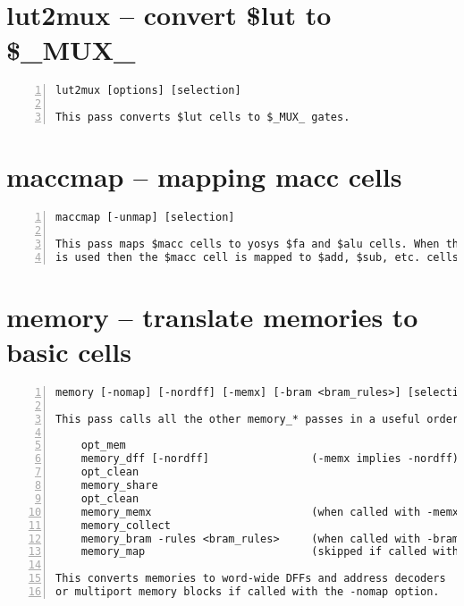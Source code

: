 \section{lut2mux -- convert \$lut to \$\_MUX\_}
\label{cmd:lut2mux}
\begin{lstlisting}[numbers=left,frame=single]
    lut2mux [options] [selection]

This pass converts $lut cells to $_MUX_ gates.
\end{lstlisting}

\section{maccmap -- mapping macc cells}
\label{cmd:maccmap}
\begin{lstlisting}[numbers=left,frame=single]
    maccmap [-unmap] [selection]

This pass maps $macc cells to yosys $fa and $alu cells. When the -unmap option
is used then the $macc cell is mapped to $add, $sub, etc. cells instead.
\end{lstlisting}

\section{memory -- translate memories to basic cells}
\label{cmd:memory}
\begin{lstlisting}[numbers=left,frame=single]
    memory [-nomap] [-nordff] [-memx] [-bram <bram_rules>] [selection]

This pass calls all the other memory_* passes in a useful order:

    opt_mem
    memory_dff [-nordff]                (-memx implies -nordff)
    opt_clean
    memory_share
    opt_clean
    memory_memx                         (when called with -memx)
    memory_collect
    memory_bram -rules <bram_rules>     (when called with -bram)
    memory_map                          (skipped if called with -nomap)

This converts memories to word-wide DFFs and address decoders
or multiport memory blocks if called with the -nomap option.
\end{lstlisting}

